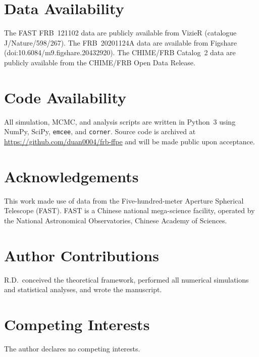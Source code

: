 \documentclass[twocolumn]{article}
\begin{document}
\section*{Data Availability}
The FAST FRB~121102 data are publicly available from VizieR (catalogue J/Nature/598/267). The FRB~20201124A data are available from Figshare (doi:10.6084/m9.figshare.20432920). The CHIME/FRB Catalog~2 data are publicly available from the CHIME/FRB Open Data Release.

\section*{Code Availability}
All simulation, MCMC, and analysis scripts are written in Python~3 using NumPy, SciPy, \texttt{emcee}\cite{foremanmackey2013}, and \texttt{corner}\cite{corner2016}. Source code is archived at \url{https://github.com/duan0004/frb-ffpe} and will be made public upon acceptance.

\section*{Acknowledgements}
This work made use of data from the Five-hundred-meter Aperture Spherical Telescope (FAST). FAST is a Chinese national mega-science facility, operated by the National Astronomical Observatories, Chinese Academy of Sciences.

\section*{Author Contributions}
R.D.\ conceived the theoretical framework, performed all numerical simulations and statistical analyses, and wrote the manuscript.

\section*{Competing Interests}
The author declares no competing interests.


\end{document}

